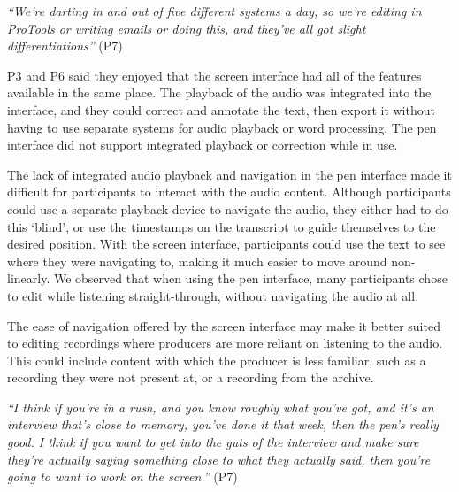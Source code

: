 \textit{``We're darting in and out of five different systems a day, so we're editing in ProTools or writing emails or
doing this, and they've all got slight differentiations''} (P7)

P3 and P6 said they enjoyed that the screen interface had all of the features available in the same place. The playback
of the audio was integrated into the interface, and they could correct and annotate the text, then export it without
having to use separate systems for audio playback or word processing. The pen interface did not support integrated
playback or correction while in use.

The lack of integrated audio playback and navigation in the pen interface made it difficult for participants to
interact with the audio content.  Although participants could use a separate playback device to navigate the audio,
they either had to do this `blind', or use the timestamps on the transcript to guide themselves to the desired
position. With the screen interface, participants could use the text to see where they were navigating to, making it
much easier to move around non-linearly.  We observed that when using the pen interface, many participants chose to
edit while listening straight-through, without navigating the audio at all.

The ease of navigation offered by the screen interface may make it better suited to editing recordings where producers
are more reliant on listening to the audio. This could include content with which the producer is less familiar, such
as a recording they were not present at, or a recording from the archive.

\textit{``I think if you're in a rush, and you know roughly what you've got, and it's an interview that's close to
memory, you've done it that week, then the pen's really good. I think if you want to get into the guts of the interview
and make sure they're actually saying something close to what they actually said, then you're going to want to work on
the screen.''} (P7)



